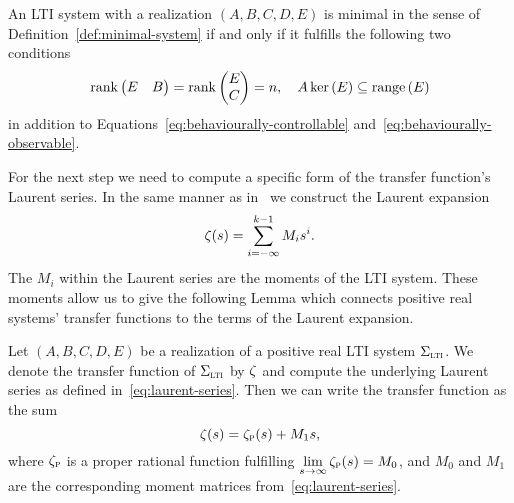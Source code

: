 \begin{lemma}\label{lem:minimality-conditions}
    An \ac{LTI} system with a realization $(A, B, C, D, E)$ is minimal in the sense of Definition~\ref{def:minimal-system} if and only if it fulfills the following two conditions
    \begin{equation*}
        \mathop{}\!\mathrm{rank}\left(\begin{matrix}
            E & B
        \end{matrix}\right) = \mathop{}\!\mathrm{rank}\left(\begin{matrix}
            E \\
            C
        \end{matrix}\right) = n,\quad A \mathop{}\!\mathrm{ker}\left(E\right) \subseteq \mathop{}\!\mathrm{range}\left(E\right)
    \end{equation*}
    in addition to Equations~\eqref{eq:behaviourally-controllable} and~\eqref{eq:behaviourally-observable}.
\end{lemma}

For the next step we need to compute a specific form of the transfer function's Laurent series.
In the same manner as in~\cite[Section~5]{CGH2022} we construct the Laurent expansion
\begin{equation}\label{eq:laurent-series}
    \zeta(s) = \sum\limits_{i = -\infty}^{k - 1} M_i s^i.
\end{equation}
The $M_i$ within the Laurent series are the moments of the \ac{LTI} system.
These moments allow us to give the following Lemma which connects positive real systems' transfer functions to the terms of the Laurent expansion.

\begin{lemma}\label{lem:lti-laurent-series}
    Let $(A, B, C, D, E)$ be a realization of a positive real \ac{LTI} system $\Sigma_{\textnormal{\scshape lti}}$.
    We denote the transfer function of $\Sigma_{\textnormal{\scshape lti}}$ by $\zeta$ and compute the underlying Laurent series as defined in~\eqref{eq:laurent-series}.
    Then we can write the transfer function as the sum
    \begin{equation}\label{eq:pr-lti-laurent-series}
        \zeta(s) = \zeta_{\textnormal{\scshape p}}(s) + M_1 s,
    \end{equation}
    where $\zeta_{\textnormal{\scshape p}}$ is a proper rational function fulfilling $\lim\limits_{s \to \infty} \zeta_{\textnormal{\scshape p}}(s) = M_0$, and $M_0$ and $M_1$ are the corresponding moment matrices from~\eqref{eq:laurent-series}.
\end{lemma}

